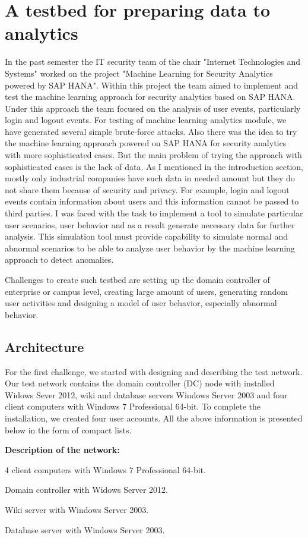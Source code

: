 \section{A testbed for preparing data to analytics}
In the past semester the IT security team of the chair "Internet Technologies and Systems" worked on the project "Machine Learning for Security Analytics powered by SAP HANA". Within this project the team aimed to implement and test the machine learning approach for security analytics based on SAP HANA. Under this approach the team focused on the analysis of user events, particularly login and logout events. For testing of machine learning analytics module, we have generated several simple brute-force attacks. Also there was the idea to try the machine learning approach powered on SAP HANA for security analytics with more sophisticated cases. But the main problem of trying the approach with sophisticated cases is the lack of data. As I mentioned in the introduction section, mostly only industrial companies have such data in needed amount but they do not share them because of security and privacy. For example, login and logout events contain information about users and this information cannot be passed to third parties. I was faced with the task to implement a tool to simulate particular user scenarios, user behavior and as a result generate necessary data for further analysis. This simulation tool must provide capability to simulate normal and abnormal scenarios to be able to analyze user behavior by the machine learning approach to detect anomalies.  

Challenges to create such testbed are setting up the domain controller of enterprise or campus level, creating large amount of users, generating random user activities and designing a model of user behavior, especially abnormal behavior.
  
\subsection{Architecture}
For the first challenge, we started with designing and describing the test network. Our test network contains the domain controller (DC) node with installed Widows Sever 2012, wiki and database servers Windows Server 2003 and four client computers with Windows 7 Professional 64-bit. To complete the installation, we created four user accounts. All the above information is presented below in the form of compact lists.

\begin{compactitem}
\item [\textbf{Description of the network:}]
\item 4 client computers with Windows 7 Professional 64-bit.
\item Domain controller with Widows Server 2012.
\item Wiki server with Windows Server 2003.
\item Database server with Windows Server 2003.
\end{compactitem}

